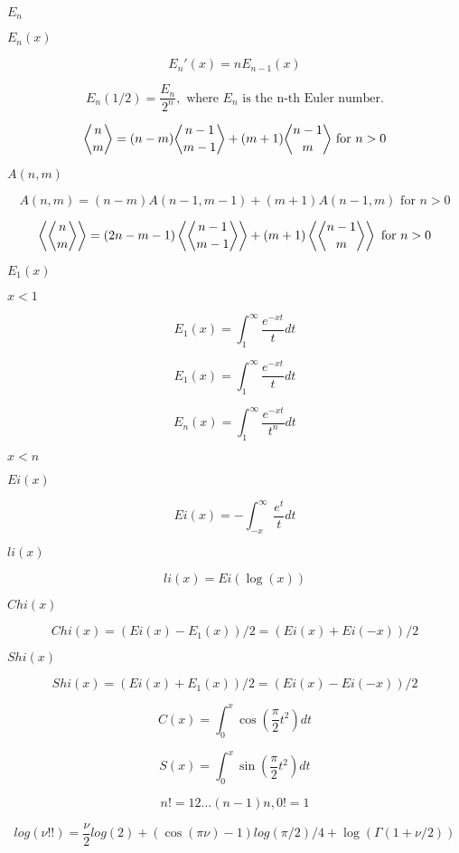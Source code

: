 \documentclass{article}
\begin{document}
$ E_n $
\pagebreak

$ E_n(x) $
\pagebreak

\[ E_n'(x) = n E_{n-1}(x) \]
\pagebreak

\[ E_n(1/2) = \frac{E_n}{2^n}, \mbox{ where } E_n \mbox{ is the n-th Euler number.} \]
\pagebreak

\[ \genfrac{\langle}{\rangle}{0pt}{0}{n}{m} = (n-m)\genfrac{\langle}{\rangle}{0pt}{0}{n-1}{m-1} + (m+1)\genfrac{\langle}{\rangle}{0pt}{0}{n-1}{m} \mbox{ for } n > 0 \]
\pagebreak

$ A(n,m) $
\pagebreak

\[ A(n,m) = (n-m)A(n-1,m-1) + (m+1)A(n-1,m) \mbox{ for } n > 0 \]
\pagebreak

\[ \left\langle\genfrac{\langle}{\rangle}{0pt}{0}{n}{m}\right\rangle = (2n-m-1) \left\langle\genfrac{\langle}{\rangle}{0pt}{0}{n-1}{m-1}\right\rangle + (m+1) \left\langle\genfrac{\langle}{\rangle}{0pt}{0}{n-1}{m}\right\rangle \mbox{ for } n > 0 \]
\pagebreak

$ E_1(x) $
\pagebreak

$ x < 1 $
\pagebreak

\[ E_1(x) = \int_{1}^{\infty} \frac{e^{-xt}}{t} dt \]
\pagebreak

\[ E_1(x) = \int_{1}^\infty \frac{e^{-xt}}{t} dt \]
\pagebreak

\[ E_n(x) = \int_{1}^\infty \frac{e^{-xt}}{t^n} dt \]
\pagebreak

$ x < n $
\pagebreak

$ Ei(x) $
\pagebreak

\[ Ei(x) = -\int_{-x}^\infty \frac{e^t}{t} dt \]
\pagebreak

$ li(x) $
\pagebreak

\[ li(x) = Ei(\log(x)) \]
\pagebreak

$ Chi(x) $
\pagebreak

\[ Chi(x) = (Ei(x) - E_1(x))/ 2 = (Ei(x) + Ei(-x))/2 \]
\pagebreak

$ Shi(x) $
\pagebreak

\[ Shi(x) = (Ei(x) + E_1(x))/2 = (Ei(x) - Ei(-x))/2 \]
\pagebreak

\[ C(x) = \int_0^x \cos(\frac{\pi}{2}t^2) dt \]
\pagebreak

\[ S(x) = \int_0^x \sin(\frac{\pi}{2}t^2) dt \]
\pagebreak

\[ n! = 1 2 ... (n-1) n, 0! = 1 \]
\pagebreak

\[ log(\nu!!) = \frac{\nu}{2} log(2) + \left(\cos(\pi\nu) - 1\right) log(\pi/2) / 4 + \log(\Gamma(1 + \nu/2)) \]
\pagebreak
\end{document}
